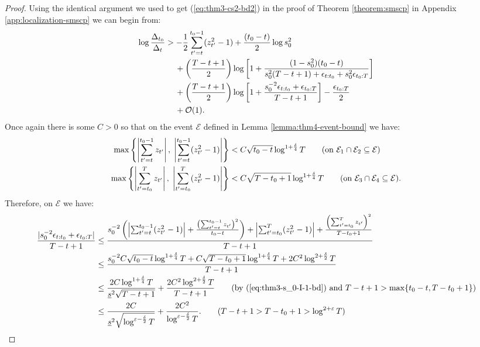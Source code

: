 \begin{proof}
Using the identical argument we used to get (\ref{eq:thm3-cs2-bd2}) in the proof of Theorem \ref{theorem:smscp} in Appendix \ref{app:localization-smscp} we can begin from:
\begin{align}
    \log \frac{\Delta_{t_0}}{\Delta_t} &> - \frac{1}{2} \sum_{t' = t}^{t_0 - 1} (z_{t'}^2-1) + \frac{(t_0-t)}{2}\log s_0^2 \notag \\
    &\quad\: + \left(\frac{T - t +1}{2}\right)\log\left[1 + \frac{(1 - s_0^2)(t_0 - t)}{s_0^{2}(T-t+1) + \epsilon_{t:t_0} + s_0^{2}\epsilon_{t_0:T} }\right] \notag \\
    &\quad\: + \left(\frac{T - t +1}{2}\right)\log\left[1 + \frac{s_0^{-2} \epsilon_{t:t_0} + \epsilon_{t_0:T} }{T-t+1}\right] - \frac{\epsilon_{t_0:T}}{2} \notag \\
    &\quad\: + \mathcal{O}(1). \label{eq:thm4-cs2-bd1}
\end{align}
Once again there is some $C>0$ so that on the event $\mathcal{E}$ defined in Lemma \ref{lemma:thm4-event-bound} we have:
\begin{align*}
    \max\left\{\left|\sum_{t'=t}^{t_0-1 } z_{t'}\right|,\;\left|\sum_{t'=t}^{t_0-1 } (z^2_{t'}-1)\right|\right\} &< C\sqrt{t_0-t}\log^{1+\frac{\delta}{4}} T \tag{on $\mathcal{E}_1\cap\mathcal{E}_2\subseteq\mathcal{E}$}\\
    \max\left\{\left|\sum_{t'=t_0}^{T} z_{t'} \right|,\;\left|\sum_{t'=t_0}^{T} (z^2_{t'}-1)\right|\right\} &< C\sqrt{T-t_0+1}\log^{1+\frac{\delta}{4}} T \tag{on $\mathcal{E}_3\cap \mathcal{E}_4\subseteq\mathcal{E}$}.
\end{align*}
Therefore, on $\mathcal{E}$ we have:
\small
\begin{align*}
    \frac{|s_0^{-2} \epsilon_{t:t_0} + \epsilon_{t_0:T}|}{T-t+1} &\leq \frac{s_0^{-2}\left(\left|\sum_{t'=t}^{t_0-1 } (z^2_{t'}-1)\right| + \frac{\left(\sum_{t'=t}^{t_0-1 } z_{t'}\right)^2}{t_0-t}\right) + \left|\sum_{t'=t_0}^{T} (z^2_{t'}-1)\right| + \frac{\left(\sum_{t'=t_0}^{T} z_{t'} \right)^2}{T-t_0+1}}{T-t+1} \\
    &\leq \frac{s_0^{-2}C\sqrt{t_0-t}\log^{1+\frac{\delta}{4}} T + C\sqrt{T-t_0+1}\log^{1+\frac{\delta}{4}} T + 2C^2\log^{2+\frac{\delta}{2}} T}{T-t+1} \\
    &\leq \frac{2C\log^{1+\frac{\delta}{4}} T}{\underline{s}^{2}\sqrt{T-t+1}} + \frac{2C^2\log^{2+\frac{\delta}{2}} T}{T-t+1} \tag{by (\ref{eq:thm3-s_0-I-1-bd}) and $T-t+1 > \max\{t_0 - t, T-t_0+1\}$} \\
    &\leq \frac{2C}{\underline{s}^{2}\sqrt{\log^{\varepsilon - \frac{\delta}{2}}T}} + \frac{2C^2}{\log^{\varepsilon-\frac{\delta}{2}} T}. \tag{$T-t+1 > T-t_0+1 > \log^{2+\varepsilon} T$}

\end{align*}
\end{proof}
